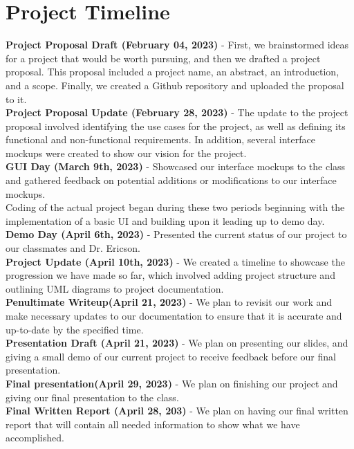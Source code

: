 \documentclass[10pt,conference,onecolumn,compsoc]{IEEEtran}
\begin{document}
\section{Project Timeline}
\textbf{Project Proposal Draft (February 04, 2023)} - First, we brainstormed ideas for a project that would be worth pursuing, and then we drafted a project proposal. This proposal included a project name, an abstract, an introduction, and a scope. Finally, we created a Github repository and uploaded the proposal to it.
\\[10pt]
\textbf{Project Proposal Update (February 28, 2023)} - The update to the project proposal involved identifying the use cases for the project, as well as defining its functional and non-functional requirements. In addition, several interface mockups were created to show our vision for the project.
\\[10pt]
\textbf{GUI Day (March 9th, 2023)}  - Showcased our interface mockups to the class and gathered feedback on potential additions or modifications to our interface mockups.
\\[10pt]
Coding of the actual project began during these two periods beginning with the implementation of a basic UI and building upon it leading up to demo day.
\\[10pt]
\textbf{Demo Day (April 6th, 2023)} - Presented the current status of our project to our classmates and Dr. Ericson.
\\[10pt]
\textbf{Project Update (April 10th, 2023)} - We created a timeline to showcase the progression we have made so far, which involved adding project structure and outlining UML diagrams to project documentation.
\\[10pt]
\textbf{Penultimate Writeup(April 21, 2023)} - We plan to revisit our work and make necessary updates to our documentation to ensure that it is accurate and up-to-date by the specified time.
\\[10pt]
\textbf{Presentation Draft (April 21, 2023)} - We plan on presenting our slides, and giving a small demo of our current project to receive feedback before our final presentation.
\\[10pt]
\textbf{Final presentation(April 29, 2023)} - We plan on finishing our project and giving our final presentation to the class.
\\[10pt]
\textbf{Final Written Report (April 28, 203)} - We plan on having our final written report that will contain all needed information to show what we have accomplished.
\end{document}
